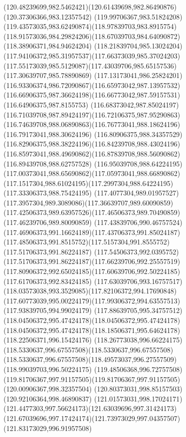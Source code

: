 {{\curveto(120.48239699,982.5462421)(120.61439698,982.86490876)(120.37306366,983.12357542)
\curveto(119.99706367,983.51824208)(119.43573035,983.62490874)(118.97839703,983.8915754)
\curveto(118.91573036,984.29824206)(118.67039703,984.64090872)(118.38906371,984.94624204)
\curveto(118.21839704,985.13024204)(117.94106372,985.31957537)(117.66373039,985.37024203)
\curveto(117.55173039,985.5129087)(117.43039706,985.65157536)(117.30639707,985.78890869)
\curveto(117.13173041,986.25824201)(116.93306374,986.72090867)(116.65973042,987.13957532)
\curveto(116.66906375,987.36624198)(116.66773042,987.59157531)(116.64906375,987.8155753)
\curveto(116.68373042,987.85024197)(116.71039708,987.89424197)(116.72106375,987.95290863)
\curveto(116.74639708,988.06890863)(116.76773041,988.18624196)(116.79173041,988.30624196)
\curveto(116.80906375,988.34357529)(116.82906375,988.38224196)(116.84239708,988.43024196)
\curveto(116.85973041,988.49690862)(116.87839708,988.56090862)(116.89439708,988.62757528)
\curveto(116.95039708,988.64224195)(117.00373041,988.65690862)(117.05973041,988.66890862)
\curveto(117.1517304,988.61024195)(117.2997304,988.64224195)(117.33306373,988.75424195)
\curveto(117.4077304,989.01957527)(117.3957304,989.3089086)(117.36639707,989.60090859)
\curveto(117.42506373,989.63957526)(117.46506373,989.70490859)(117.46239706,989.80090859)
\curveto(117.43839706,990.46757524)(117.46906373,991.16624189)(117.43706373,991.85024187)
\curveto(117.48506373,991.8515752)(117.5157304,991.8555752)(117.51706373,991.86224187)
\curveto(117.54506373,992.0395752)(117.51706373,991.86224187)(117.66239706,992.25557519)
\curveto(117.80906372,992.65024185)(117.60639706,992.50224185)(117.61706373,992.83424185)
\curveto(117.63039706,993.16757517)(118.03573038,993.3529085)(117.82106372,994.17690848)
\curveto(117.60773039,995.00224179)(117.99306372,994.63557513)(117.93839705,994.99024179)
\curveto(117.88639705,995.34757512)(118.04506372,995.47424178)(118.04506372,995.47424178)
\curveto(118.04506372,995.47424178)(118.18506371,995.64624178)(118.22506371,996.15424176)
\curveto(118.26773038,996.66224175)(118.5330637,996.67557508)(118.5330637,996.67557508)
\curveto(118.5330637,996.67557508)(118.49573037,996.27557509)(118.99039703,996.50224175)
\curveto(119.48506368,996.72757508)(119.81706367,997.91157505)(119.81706367,997.91157505)
\lineto(120.00906367,998.32357504)
\lineto(120.80373031,998.85157503)
\lineto(120.92106364,998.46890837)
\curveto(121.01573031,998.17024171)(121.4477303,997.56624173)(121.63039696,997.31424173)
\curveto(121.67039696,997.17424174)(121.73973029,997.04357507)(121.83173029,996.91957508)
}}
